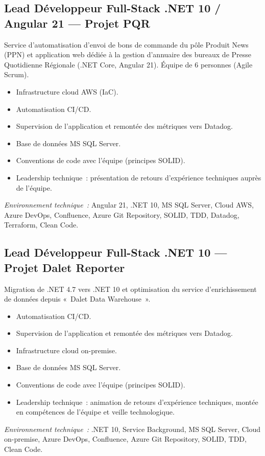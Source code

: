 \documentclass[10pt,a4paper]{article}
\begin{document}
\vspace{6pt}

\subsection*{Lead Développeur Full-Stack .NET 10 / Angular 21 --- Projet PQR}
\color{darkgray}
Service d'automatisation d'envoi de bons de commande du pôle Produit News (PPN) et application web dédiée à la gestion d'annuaire des bureaux de Presse Quotidienne Régionale (.NET Core, Angular 21). Équipe de 6 personnes (Agile Scrum).
\begin{itemize}
  \item Infrastructure cloud AWS (IaC).
  \item Automatisation CI/CD.
  \item Supervision de l'application et remontée des métriques vers Datadog.
  \item Base de données MS SQL Server.
  \item Conventions de code avec l'équipe (principes SOLID).
  \item Leadership technique~: présentation de retours d'expérience techniques auprès de l'équipe.
\end{itemize}
\textit{Environnement technique~:} Angular 21, .NET 10, MS SQL Server, Cloud AWS, Azure DevOps, Confluence, Azure Git Repository, SOLID, TDD, Datadog, Terraform, Clean Code.

\vspace{6pt}

\subsection*{Lead Développeur Full-Stack .NET 10 --- Projet Dalet Reporter}
\color{darkgray}
Migration de .NET 4.7 vers .NET 10 et optimisation du service d'enrichissement de données depuis «~Dalet Data Warehouse~».
\begin{itemize}
  \item Automatisation CI/CD.
  \item Supervision de l'application et remontée des métriques vers Datadog.
  \item Infrastructure cloud on-premise.
  \item Base de données MS SQL Server.
  \item Conventions de code avec l'équipe (principes SOLID).
  \item Leadership technique~: animation de retours d'expérience techniques, montée en compétences de l'équipe et veille technologique.
\end{itemize}
\textit{Environnement technique~:} .NET 10, Service Background, MS SQL Server, Cloud on-premise, Azure DevOps, Confluence, Azure Git Repository, SOLID, TDD, Clean Code.
\end{document}
